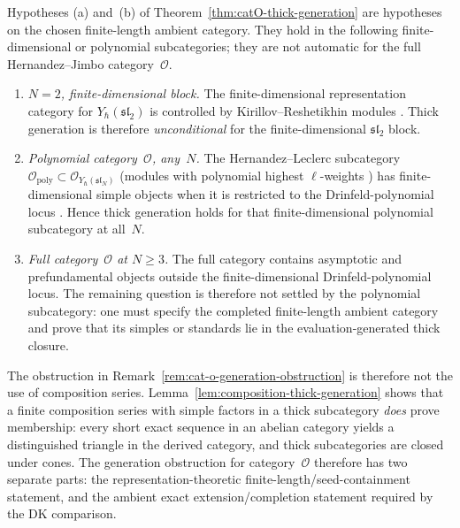 \begin{remark}
\label{rem:catO-thick-generation-verification}
Hypotheses (a) and~(b) of
Theorem~\ref{thm:catO-thick-generation} are hypotheses on the chosen
finite-length ambient category. They hold in the following
finite-dimensional or polynomial subcategories; they are not automatic
for the full Hernandez--Jimbo category~$\mathcal O$.
\begin{enumerate}[label=\textup{(\roman*)}]
\item \emph{$N = 2$, finite-dimensional block.}
 The finite-dimensional representation category for
 $Y_\hbar(\mathfrak{sl}_2)$ is controlled by
 Kirillov--Reshetikhin modules \cite{ChariPressley94}.
 Thick generation is therefore
 \emph{unconditional} for the finite-dimensional
 $\mathfrak{sl}_2$ block.
\item \emph{Polynomial category~$\mathcal{O}$, any~$N$.}
 The Hernandez--Leclerc subcategory
 $\mathcal{O}_{\mathrm{poly}} \subset
 \mathcal{O}_{Y_\hbar(\mathfrak{sl}_N)}$ (modules
 with polynomial highest $\ell$-weights
 \cite{HernandezLeclerc10}) has finite-dimensional simple objects
 when it is restricted to the Drinfeld-polynomial locus
 \cite{Drinfeld88}. Hence thick generation holds for that
 finite-dimensional polynomial subcategory at all~$N$.
\item \emph{Full category~$\mathcal{O}$ at $N \ge 3$.}
 The full category contains asymptotic and prefundamental objects
 outside the finite-dimensional Drinfeld-polynomial locus. The
 remaining question is therefore not settled by the polynomial
 subcategory: one must specify the completed finite-length ambient
 category and prove that its simples or standards lie in the
 evaluation-generated thick closure.
\end{enumerate}

The obstruction in
Remark~\ref{rem:cat-o-generation-obstruction} is therefore not the
use of composition series.
Lemma~\ref{lem:composition-thick-generation} shows that a
finite composition series with simple factors in a thick
subcategory \emph{does} prove membership: every short exact
sequence in an abelian category yields a distinguished triangle
in the derived category, and thick subcategories are closed under
cones. The generation obstruction for category~$\mathcal{O}$
therefore has two separate parts: the representation-theoretic
finite-length/seed-containment statement, and the ambient exact
extension/completion statement required by the DK comparison.
\end{remark}

